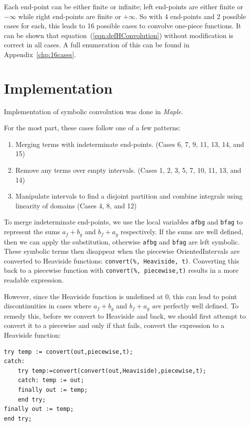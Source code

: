 Each end-point can be either finite or infinite; left end-points are either finite or $-\infty$ while right end-points are finite
or $+\infty$.
So with 4 end-points and 2 possible cases for each, this leads to 16 possible cases to convolve one-piece functions.
It can be shown that equation~(\ref{eqn:defHConvolution}) without modification is correct in all cases.
A full enumeration of this can be found in Appendix~\ref{chp:16cases}.



\section{Implementation}

Implementation of symbolic convolution was done in \emph{Maple}.



For the most part, these cases follow one of a few patterns:
\begin{enumerate}
	\item Merging terms with indeterminate end-points. (Cases 6, 7, 9, 11, 13, 14, and 15)
	\item Remove any terms over empty intervals. (Cases 1, 2, 3, 5, 7, 10, 11, 13, and 14)
	\item Manipulate intervals to find a disjoint partition and combine integrals using linearity of domains 
	(Cases 4, 8, and 12)
\end{enumerate}

To merge indeterminate end-points, we use the local variables \texttt{afbg} and \texttt{bfag} to represent the sums
$a_f+b_g$ and $b_f+a_g$ respectively.
If the sums are well defined, then we can apply the substitution, otherwise \texttt{afbg} and \texttt{bfag} are left symbolic.
These symbolic terms then disappear when the piecewise OrientedIntervals are converted to Heaviside functions:
 \texttt{convert(\%, Heaviside, t)}.
Converting this back to a piecewise function with \texttt{convert(\%, piecewise,t)} results in a more readable expression.
 
However, since the Heaviside function is undefined at 0, this can lead to point discontinuities in cases where $a_f+b_g$ and
 $b_f+a_g$ \emph{are} perfectly well defined.
To remedy this, before we convert to Heaviside and back, we should first attempt to convert it to a piecewise and only if 
that fails, convert the expression to a Heaviside function:

\lstset{language=Pascal}
\begin{lstlisting}[frame=single]
try temp := convert(out,piecewise,t);
catch: 
    try temp:=convert(convert(out,Heaviside),piecewise,t);
    catch: temp := out;
    finally out := temp;
    end try;  
finally out := temp; 
end try;
\end{lstlisting}


